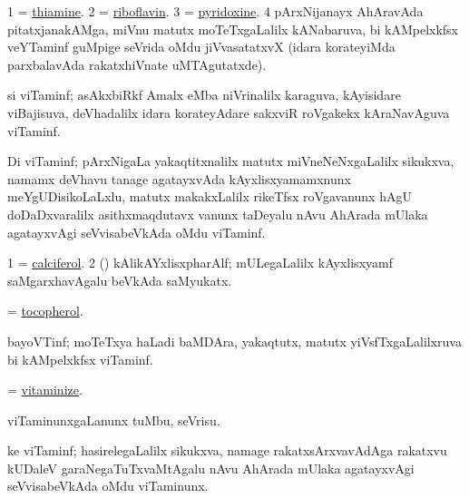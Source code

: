 \noindent 
\gl{\pagu}
\expl{}
\bmng
\bnum
\num{1} = \hyperref{kandict_t.pdf}{T}{thiamine}{thiamine}. 
\num{2} = \hyperref{kandict_r.pdf}{R}{riboflavin}{riboflavin}. 
\num{3} = \hyperref{kandict_p.pdf}{P}{pyridoxine}{pyridoxine}. 
\num{4} pArxNijanayx AhAravAda pitatxjanakAMga, miVnu matutx moTeTxgaLalilx kANabaruva, bi kAMpelxkfsx veYTaminf guMpige seVrida oMdu jiVvasatatxvX (idara korateyiMda parxbalavAda rakatxhiVnate uMTAgutatxde). 
\enum
\emng
\eentry

\bentry
{}
\gl{\nA}
\expl{}
\bmng
 si viTaminf; asAkxbiRkf Amalx eMba niVrinalilx karaguva, kAyisidare viBajisuva, deVhadalilx idara korateyAdare sakxviR roVgakekx kAraNavAguva viTaminf. 
\emng
\eentry

\bentry
{}
\gl{\nA}
\expl{}
\bmng
Di viTaminf; pArxNigaLa yakaqtitxnalilx matutx miVneNeNxgaLalilx sikukxva, namamx deVhavu tanage agatayxvAda kAyxlisxyamamxnunx meYgUDisikoLaLxlu, matutx makakxLalilx rikeTfsx roVgavanunx hAgU doDaDxvaralilx asithxmaqdutavx  vanunx taDeyalu nAvu AhArada mUlaka agatayxvAgi seVvisabeVkAda oMdu viTaminf. 
\emng

\noindent 
\gl{\pagu}
\expl{}
\bmng
\bnum
\num{1} = \hyperref{kandict_c.pdf}{C}{calciferol}{calciferol}. 
\num{2} (\jiVra) kAlikAYxlisxpharAlf; mULegaLalilx kAyxlisxyamf saMgarxhavAgalu beVkAda saMyukatx. 
\enum
\emng
\eentry

\bentry
{}
\gl{\nA}
\expl{}
\bmng
 = \hyperref{kandict_t.pdf}{T}{tocopherol}{tocopherol}. 
\emng
\eentry

\bentry
{}
\gl{\nA}
\expl{}
\bmng
 bayoVTinf; moTeTxya haLadi baMDAra, yakaqtutx, matutx yiVsfTxgaLalilxruva bi kAMpelxkfsx viTaminf. 
\emng
\eentry

\bentry
{} 
\gl{\sakirx}
\expl{}
\bmng
 = \hyperlink{vitaminize}{vitaminize}. 
\emng
\eentry

\bentry
{} 
\gl{\sakirx}
\expl{}
\bmng
 viTaminunxgaLanunx tuMbu, seVrisu. 
\emng
\eentry

\bentry
{}
\gl{\nA}
\expl{}
\bmng
 ke viTaminf; hasirelegaLalilx sikukxva, namage rakatxsArxvavAdAga rakatxvu kUDaleV garaNegaTuTxvaMtAgalu nAvu AhArada mUlaka agatayxvAgi seVvisabeVkAda oMdu viTaminunx. 
\emng

